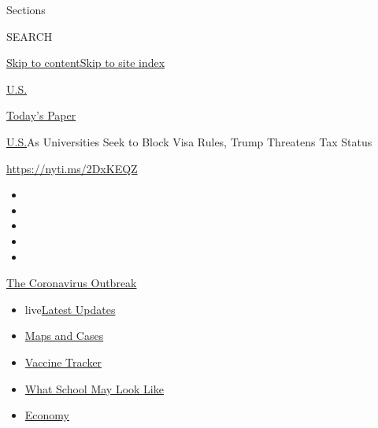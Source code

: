 Sections

SEARCH

\protect\hyperlink{site-content}{Skip to
content}\protect\hyperlink{site-index}{Skip to site index}

\href{https://www.nytimes.com/section/us}{U.S.}

\href{https://myaccount.nytimes.com/auth/login?response_type=cookie\&client_id=vi}{}

\href{https://www.nytimes.com/section/todayspaper}{Today's Paper}

\href{/section/us}{U.S.}\textbar{}As Universities Seek to Block Visa
Rules, Trump Threatens Tax Status

\url{https://nyti.ms/2DxKEQZ}

\begin{itemize}
\item
\item
\item
\item
\item
\end{itemize}

\href{https://www.nytimes.com/news-event/coronavirus?action=click\&pgtype=Article\&state=default\&region=TOP_BANNER\&context=storylines_menu}{The
Coronavirus Outbreak}

\begin{itemize}
\tightlist
\item
  live\href{https://www.nytimes.com/2020/08/02/world/coronavirus-updates.html?action=click\&pgtype=Article\&state=default\&region=TOP_BANNER\&context=storylines_menu}{Latest
  Updates}
\item
  \href{https://www.nytimes.com/interactive/2020/us/coronavirus-us-cases.html?action=click\&pgtype=Article\&state=default\&region=TOP_BANNER\&context=storylines_menu}{Maps
  and Cases}
\item
  \href{https://www.nytimes.com/interactive/2020/science/coronavirus-vaccine-tracker.html?action=click\&pgtype=Article\&state=default\&region=TOP_BANNER\&context=storylines_menu}{Vaccine
  Tracker}
\item
  \href{https://www.nytimes.com/interactive/2020/07/29/us/schools-reopening-coronavirus.html?action=click\&pgtype=Article\&state=default\&region=TOP_BANNER\&context=storylines_menu}{What
  School May Look Like}
\item
  \href{https://www.nytimes.com/live/2020/07/31/business/stock-market-today-coronavirus?action=click\&pgtype=Article\&state=default\&region=TOP_BANNER\&context=storylines_menu}{Economy}
\end{itemize}

